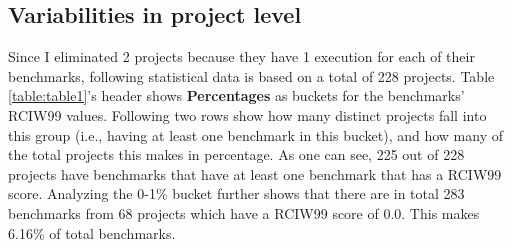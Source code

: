 \documentclass{seal_thesis}
\begin{document}
\subsection{Variabilities in project level}

Since I eliminated 2 projects because they have 1 execution for each of their benchmarks, following statistical data is based on a total of 228 projects. Table \ref{table:table1}'s header shows \textbf{Percentages} as buckets for the benchmarks' RCIW99 values. Following two rows show how many distinct projects fall into this group (i.e., having at least one benchmark in this bucket), and how many of the total projects this makes in percentage. As one can see, 225 out of 228 projects have benchmarks that have at least one benchmark that has a RCIW99 score. Analyzing the 0-1\% bucket further shows that there are in total 283 benchmarks from 68 projects which have a RCIW99 score of 0.0. This makes 6.16\% of total benchmarks.
\end{document}
